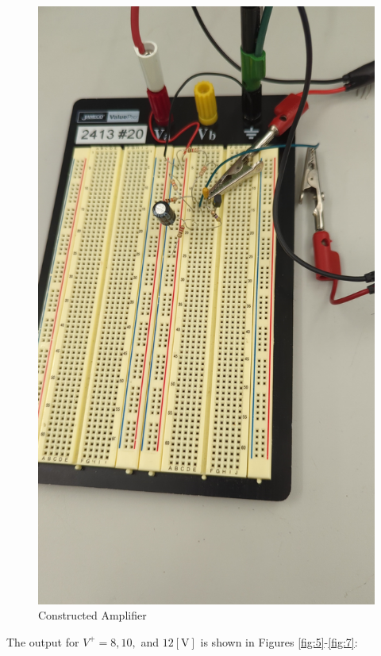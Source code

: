 \documentclass[
	letterpaper, %
	10pt, %
]{CSUniSchoolLabReport}
\begin{document}
\begin{figure}[H]
  \centering
  \includegraphics[width=.9\textwidth]{Figures/L4F2}
  \caption{Constructed Amplifier}
  \label{fig:4}
\end{figure}

The output for $V^{+}=8,10,$ and $12[\si{\volt}]$ is shown in Figures \ref{fig:5}-\ref{fig:7}:
\end{document}
